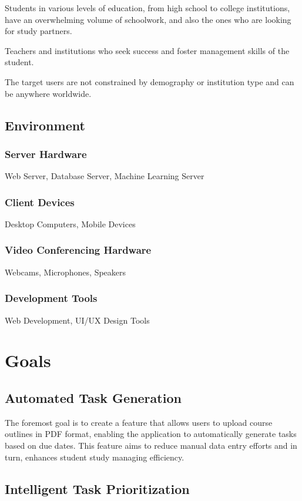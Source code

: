 \documentclass{article}
\begin{document}
    Students in various levels of education, from high school to college institutions, have an overwhelming volume of schoolwork, and also the ones who are looking for study partners. 

    Teachers and institutions who seek success and foster management skills of the student.

    The target users are not constrained by demography or institution type and can be anywhere worldwide.

\subsection{Environment}
\subsubsection{Server Hardware}
Web Server, Database Server, Machine Learning Server
\subsubsection{Client Devices}
Desktop Computers, Mobile Devices
\subsubsection{Video Conferencing Hardware}
Webcams, Microphones, Speakers

\subsubsection{Development Tools}
Web Development, UI/UX Design Tools
\section{Goals}

    \subsection{Automated Task Generation}
    
    The foremost goal is to create a feature that allows users to upload course outlines in PDF format, enabling the application to automatically generate tasks based on due dates. This feature aims to reduce manual data entry efforts and in turn, enhances student study managing efficiency.
       
    \subsection{Intelligent Task Prioritization}
\end{document}

